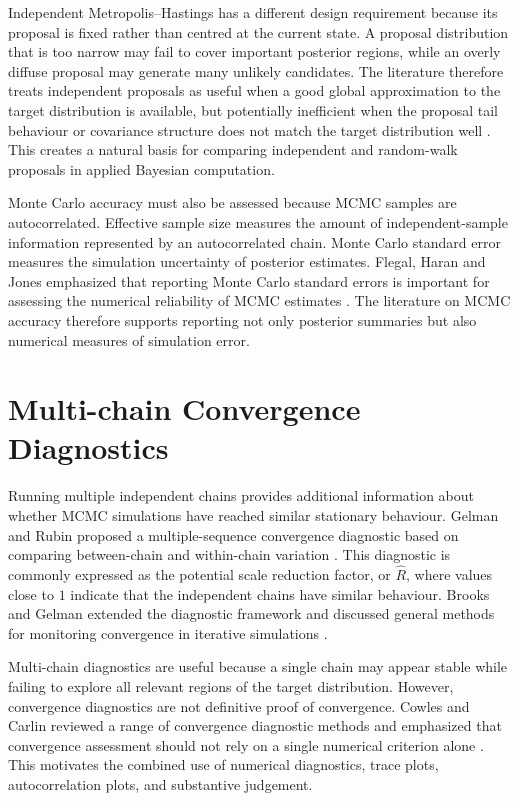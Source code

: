 Independent Metropolis--Hastings has a different design requirement because its proposal is fixed rather than centred at the current state. A proposal distribution that is too narrow may fail to cover important posterior regions, while an overly diffuse proposal may generate many unlikely candidates. The literature therefore treats independent proposals as useful when a good global approximation to the target distribution is available, but potentially inefficient when the proposal tail behaviour or covariance structure does not match the target distribution well \cite{chib1995understanding,tierney1994markov}. This creates a natural basis for comparing independent and random-walk proposals in applied Bayesian computation.

Monte Carlo accuracy must also be assessed because MCMC samples are autocorrelated. Effective sample size measures the amount of independent-sample information represented by an autocorrelated chain. Monte Carlo standard error measures the simulation uncertainty of posterior estimates. Flegal, Haran and Jones emphasized that reporting Monte Carlo standard errors is important for assessing the numerical reliability of MCMC estimates \cite{flegal2008mcmc}. The literature on MCMC accuracy therefore supports reporting not only posterior summaries but also numerical measures of simulation error.

\section{Multi-chain Convergence Diagnostics}

Running multiple independent chains provides additional information about whether MCMC simulations have reached similar stationary behaviour. Gelman and Rubin proposed a multiple-sequence convergence diagnostic based on comparing between-chain and within-chain variation \cite{gelman1992inference}. This diagnostic is commonly expressed as the potential scale reduction factor, or $\hat{R}$, where values close to $1$ indicate that the independent chains have similar behaviour. Brooks and Gelman extended the diagnostic framework and discussed general methods for monitoring convergence in iterative simulations \cite{brooks1998general}.

Multi-chain diagnostics are useful because a single chain may appear stable while failing to explore all relevant regions of the target distribution. However, convergence diagnostics are not definitive proof of convergence. Cowles and Carlin reviewed a range of convergence diagnostic methods and emphasized that convergence assessment should not rely on a single numerical criterion alone \cite{cowles1996markov}. This motivates the combined use of numerical diagnostics, trace plots, autocorrelation plots, and substantive judgement.


